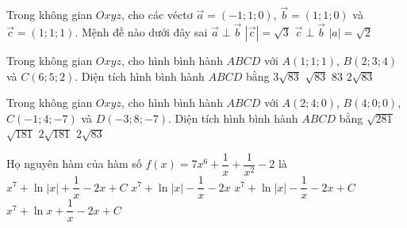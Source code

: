 \begin{ex}%
Trong không gian $Oxyz$, cho các véctơ $\vec{a}=\left(-1;1;0\right)$, $\vec{b}=\left(1;1;0\right)$ và $\vec{c}=\left(1;1;1\right)$. Mệnh đề nào dưới đây sai
\choice
{$\vec{a} \perp \vec{b}$}
{$\left|\vec{c}\right|=\sqrt{3}$}
{\True $\vec{c}\perp \vec{b}$}
{$\left|a\right|=\sqrt{2}$}
\end{ex}

\begin{ex}%
Trong không gian $Oxyz$, cho hình bình hành  $ABCD$ với  $A(1;1;1)$, $B(2;3;4)$ và $C(6;5;2)$. Diện tích hình bình hành $ABCD$  bằng \choice
{$3\sqrt{83} $}
{$\sqrt{83} $}
{$ 83 $}
{\True $2\sqrt{83}$}
\end{ex}

\begin{ex}%
Trong không gian $Oxyz$, cho hình bình hành  $ABCD$ với  $A(2;4;0)$, $B(4;0;0)$,  $C(-1;4;-7)$ và $D(-3;8;-7)$. Diện tích hình bình hành $ABCD$  bằng \choice
{$\sqrt{281} $}
{$\sqrt{181} $}
{\True $ 2\sqrt{181} $}
{$2\sqrt{83}$}

\end{ex}

\begin{ex}%
Họ nguyên hàm của hàm số $f(x)=7 x^{6}+\dfrac{1}{x}+\dfrac{1}{x^2}-2$ là
\choice
{$x^{7}+\ln |x|+\dfrac{1}{x}-2x+C$}
{$x^{7}+\ln |x|-\dfrac{1}{x}-2x$}
{\True $x^{7}+\ln |x|-\dfrac{1}{x}-2x+C$}
{$x^{7}+\ln x+\dfrac{1}{x}-2x+C$}
\end{ex}

